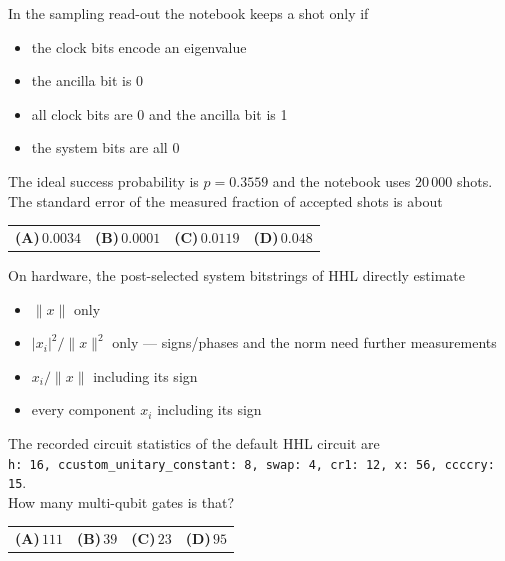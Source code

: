 \documentclass[11pt,a4paper]{article}
\newcommand{\optlabel}[1]{\textbf{(#1)}}
\newenvironment{qitem}[1]{\begin{list}{}{\setlength{\leftmargin}{3.3em}\setlength{\labelwidth}{3.1em}%
  \setlength{\labelsep}{0.2em}\setlength{\topsep}{3pt}\setlength{\parsep}{3pt}}\item[\textbf{Q.#1}\hfill]}{\end{list}}
\newcommand{\qsep}{\par\vspace{2pt}{\color{black!15}\hrule}\vspace{4pt}}
\begin{document}
\begin{qitem}{54}
In the sampling read-out the notebook keeps a shot only if
\begin{itemize}[leftmargin=2.6em, labelsep=0.4em, itemsep=2pt, topsep=3pt]
\item[\optlabel{A}] the clock bits encode an eigenvalue
\item[\optlabel{B}] the ancilla bit is 0
\item[\optlabel{C}] all clock bits are 0 and the ancilla bit is 1
\item[\optlabel{D}] the system bits are all 0
\end{itemize}
\end{qitem}
\qsep

\begin{qitem}{55}
The ideal success probability is $p = 0.3559$ and the notebook uses $20\,000$ shots. The standard error of the measured fraction of accepted shots is about
\par\smallskip\noindent\begin{tabularx}{\linewidth}{@{}*{4}{L}@{}}
\optlabel{A}\,$0.0034$ & \optlabel{B}\,$0.0001$ & \optlabel{C}\,$0.0119$ & \optlabel{D}\,$0.048$
\end{tabularx}
\end{qitem}
\qsep

\begin{qitem}{56}
On hardware, the post-selected system bitstrings of HHL directly estimate
\begin{itemize}[leftmargin=2.6em, labelsep=0.4em, itemsep=2pt, topsep=3pt]
\item[\optlabel{A}] $\|x\|$ only
\item[\optlabel{B}] $|x_i|^2/\|x\|^2$ only --- signs/phases and the norm need further measurements
\item[\optlabel{C}] $x_i/\|x\|$ including its sign
\item[\optlabel{D}] every component $x_i$ including its sign
\end{itemize}
\end{qitem}
\qsep

\begin{qitem}{57}
The recorded circuit statistics of the default HHL circuit are\\
\hspace*{1em}\texttt{h: 16, ccustom\_unitary\_constant: 8, swap: 4, cr1: 12, x: 56, ccccry: 15}.\\
How many multi-qubit gates is that?
\par\smallskip\noindent\begin{tabularx}{\linewidth}{@{}*{4}{L}@{}}
\optlabel{A}\,$111$ & \optlabel{B}\,$39$ & \optlabel{C}\,$23$ & \optlabel{D}\,$95$
\end{tabularx}
\end{qitem}
\qsep
\end{document}
